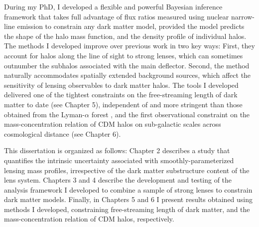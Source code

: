 During my PhD, I developed a flexible and powerful Bayesian inference framework that takes full advantage of flux ratios measured using nuclear narrow-line emission to constrain any dark matter model, provided the model predicts the shape of the halo mass function, and the density profile of individual halos. The methods I developed improve over previous work in two key ways: First, they account for halos along the line of sight to strong lenses, which can sometimes outnumber the subhalos associated with the main deflector. Second, the method naturally accommodates spatially extended background sources, which affect the sensitivity of lensing observables to dark matter halos. The tools I developed delivered one of the tightest constraints on the free-streaming length of dark matter to date (see Chapter 5), independent of and more stringent than those obtained from the Lyman-$\alpha$ forest \citep{Viel13}, and the first observational constraint on the mass-concentration relation of CDM halos on sub-galactic scales across cosmological distance (see Chapter 6). 

This dissertation is organized as follows: Chapter 2 describes a study that quantifies the intrinsic uncertainty associated with smoothly-parameterized lensing mass profiles, irrespective of the dark matter substructure content of the lens system. Chapters 3 and 4 describe the development and testing of the analysis framework I developed to combine a sample of strong lenses to constrain dark matter models. Finally, in Chapters 5 and 6 I present results obtained using methods I developed, constraining free-streaming length of dark matter, and the mass-concentration relation of CDM halos, respectively. 

% 
%



